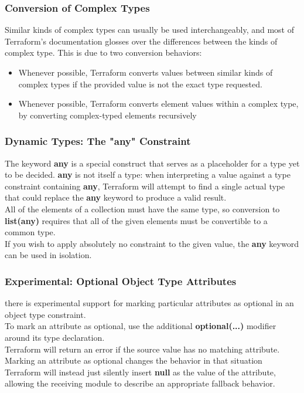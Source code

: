 \documentclass[12pt, letterpaper, twoside]{article}
\begin{document}
\subsubsection{Conversion of Complex Types}
Similar kinds of complex types can usually be used interchangeably, and most of Terraform's documentation glosses 
over the differences between the kinds of complex type. This is due to two conversion behaviors:\\
\begin{itemize}
	\item Whenever possible, Terraform converts values between similar kinds of complex types if the provided value is 
		not the exact type requested.
	\item Whenever possible, Terraform converts element values within a complex type, by converting complex-typed 
		elements recursively
\end{itemize}

\subsubsection{Dynamic Types: The "any" Constraint}
The keyword \textbf{any} is a special construct that serves as a placeholder for a type yet to be decided. 
\textbf{any} is not itself a type: when interpreting a value against a type constraint containing \textbf{any},
Terraform will attempt to find a single actual type that could replace the \textbf{any} keyword to produce a 
valid result.\\

All of the elements of a collection must have the same type, so conversion to \textbf{list(any)} requires that all of 
the given elements must be convertible to a common type.\\

If you wish to apply absolutely no constraint to the given value, the \textbf{any} keyword can be used in isolation.

\subsubsection{Experimental: Optional Object Type Attributes}
there is experimental support for marking particular attributes as optional in an object type constraint.\\
To mark an attribute as optional, use the additional \textbf{optional(...)} modifier around its type declaration.\\

Terraform will return an error if the source value has no matching attribute. Marking an attribute as optional 
changes the behavior in that situation
Terraform will instead just silently insert \textbf{null} as the value of the attribute, allowing the receiving 
module to describe an appropriate fallback behavior.
\end{document}
